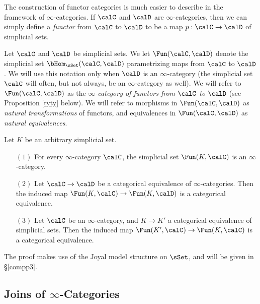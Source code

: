 The construction of functor categories is much easier to describe in the framework of $\infty$-categories. If $\calC$ and $\calD$ are
$\infty$-categories, then we can simply define a {\it functor} from
$\calC$ to $\calD$ to be a map $p: \calC \rightarrow \calD$ of simplicial sets.

\begin{notation}
Let $\calC$ and $\calD$ be simplicial sets. We let $\Fun(\calC, \calD)$ denote the
simplicial set $\bHom_{\sSet}(\calC, \calD)$ parametrizing maps from $\calC$ to $\calD$.
We will use this notation only when $\calD$ is an $\infty$-category (the simplicial set $\calC$ will often, but not always, be an $\infty$-category as well). We will refer to $\Fun(\calC, \calD)$ as the
{\it $\infty$-category of functors from $\calC$ to $\calD$} (see Proposition \ref{tyty} below).
We will refer to morphisms in $\Fun(\calC, \calD)$ as {\it natural transformations} of functors, and
equivalences in $\Fun(\calC, \calD)$ as {\it natural equivalences}.
\end{notation}

\begin{proposition}\label{tyty}
Let $K$ be an arbitrary simplicial set.
\begin{itemize}
\item[$(1)$] For every $\infty$-category $\calC$, the simplicial set $\Fun(K,\calC)$ is an $\infty$-category.

\item[$(2)$] Let $\calC \rightarrow \calD$ be a categorical equivalence of $\infty$-categories. Then the induced map $\Fun(K,\calC) \rightarrow \Fun(K,\calD)$ is a categorical equivalence.

\item[$(3)$] Let $\calC$ be an $\infty$-category, and $K \rightarrow K'$ a categorical equivalence of simplicial sets. Then the induced map $\Fun(K',\calC) \rightarrow \Fun(K,\calC)$ is a categorical equivalence.
\end{itemize}
\end{proposition}

The proof makes use of the Joyal model structure on $\sSet$, and will be given in \S \ref{compp3}.

\subsection{Joins of $\infty$-Categories}\label{join}

